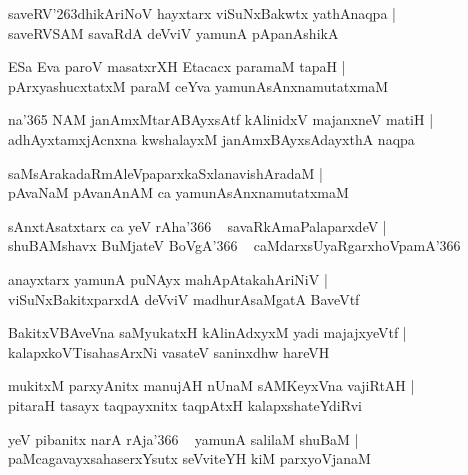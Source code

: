 \documentclass[twoside,12pt,openright]{book}
\def\S{\char'263}
\newcounter{shloka}[chapter]
\begin{document}
\begin{shloka}
saveRV\S dhikAriNoV hayxtarx viSuNxBakwtx yathAnaqpa |\\
saveRVSAM savaRdA deVviV yamunA pApanAshikA 
\end{shloka}

\begin{shloka}
ESa Eva paroV masatxrXH Etacacx paramaM tapaH |\\
pArxyashucxtatxM paraM ceYva yamunAsAnxnamutatxmaM 
\end{shloka}

\begin{shloka}
na\char'365 NAM janAmxMtarABAyxsAtf kAlinidxV majanxneV matiH |\\
adhAyxtamxjAcnxna kwshalayxM janAmxBAyxsAdayxthA naqpa
\end{shloka}

\begin{shloka}
saMsArakadaRmAleVpaparxkaSxlanavishAradaM |\\
pAvaNaM pAvanAnAM ca yamunAsAnxnamutatxmaM 
\end{shloka}

\begin{shloka}
sAnxtAsatxtarx ca yeV rAha\char'366 ~ savaRkAmaPalaparxdeV |\\
shuBAMshavx BuMjateV BoVgA\char'366 ~ caMdarxsUyaRgarxhoVpamA\char'366
\end{shloka}

\begin{shloka}
anayxtarx yamunA puNAyx mahApAtakahAriNiV |\\
viSuNxBakitxparxdA deVviV madhurAsaMgatA BaveVtf
\end{shloka}

\begin{shloka}
BakitxVBAveVna saMyukatxH kAlinAdxyxM yadi majajxyeVtf |\\
kalapxkoVTisahasArxNi vasateV saninxdhw hareVH 
\end{shloka}

\begin{shloka}
mukitxM parxyAnitx manujAH nUnaM sAMKeyxVna vajiRtAH |\\
pitaraH tasayx taqpayxnitx taqpAtxH kalapxshateYdiRvi 
\end{shloka}

\begin{shloka}
yeV pibanitx narA rAja\char'366 ~ yamunA salilaM shuBaM |\\
paMcagavayxsahaserxYsutx seVviteYH kiM parxyoVjanaM
\end{shloka}
\end{document}
